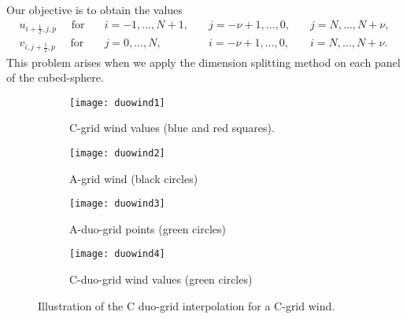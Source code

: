 Our objective is to obtain the values 
\begin{align*}
	u_{i+\frac{1}{2},j,p} \quad \text{ for} \quad &i=-1, \ldots, N+1, \quad &j=-\nu+1, \ldots, 0, \quad &j=N, \ldots, N+\nu,\\
	v_{i,j+\frac{1}{2},p} \quad \text{ for} \quad &j=0, \ldots, N, \quad &i=-\nu+1, \ldots, 0,\quad &i=N, \ldots, N+\nu.
\end{align*}
This problem arises when we apply the dimension splitting method on each panel of the cubed-sphere.
\begin{figure}[!htb]
	\centering
	\begin{subfigure}{0.45\textwidth}
		\texttt{[image: duowind1]}
		\caption{C-grid wind values (blue and red squares).\label{cs-duovec-1}}
	\end{subfigure}
	\begin{subfigure}{0.45\textwidth}
		\centering
		\texttt{[image: duowind2]}
		\caption{A-grid wind (black circles)\label{cs-duovec-2}}
	\end{subfigure}
	
	\begin{subfigure}{0.45\textwidth}
		\centering
		\texttt{[image: duowind3]}
		\caption{A-duo-grid points (green circles)\label{cs-duovec-3}}
	\end{subfigure}
	\begin{subfigure}{0.45\textwidth}
		\centering
		\texttt{[image: duowind4]}
		\caption{C-duo-grid  wind values (green circles) \label{cs-duovec-4}}
	\end{subfigure}
	\caption{Illustration of the C duo-grid interpolation for a C-grid wind. \label{cs-duovec}}
\end{figure}

